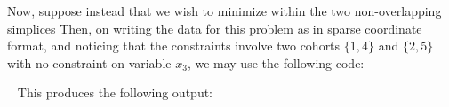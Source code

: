 \documentclass{galahad}
\begin{document}
Now, suppose instead that we wish to minimize
within the two non-overlapping simplices 
Then, on writing the data for this problem as
in sparse coordinate format, and noticing that the constraints
involve two cohorts $\{1,4\}$ and $\{2,5\}$ with no constraint on
variable $x_3$, we may use the following code:

{\tt \small
\VerbatimInput{\packageexampled}
}
\noindent
This produces the following output: \vspace*{-2mm}
{\tt \small
\VerbatimInput{\packageresultsd}
}
\noindent
\end{document}
